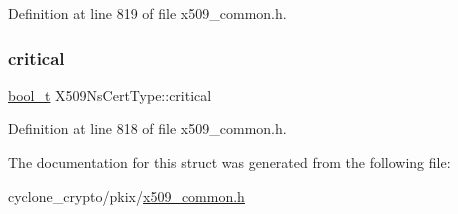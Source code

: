 Definition at line 819 of file x509\+\_\+common.\+h.

\mbox{\label{structX509NsCertType_ae633c6008dfd10b8d487d9c4f92eae7b}} 
\subsubsection{\texorpdfstring{critical}{critical}}
{\footnotesize\ttfamily \hyperlink{compiler__port_8h_a812d16e5494522586b3784e55d479912}{bool\+\_\+t} X509\+Ns\+Cert\+Type\+::critical}



Definition at line 818 of file x509\+\_\+common.\+h.



The documentation for this struct was generated from the following file\+:\begin{DoxyCompactItemize}
\item 
cyclone\+\_\+crypto/pkix/\hyperlink{pkix_2x509__common_8h}{x509\+\_\+common.\+h}\end{DoxyCompactItemize}
